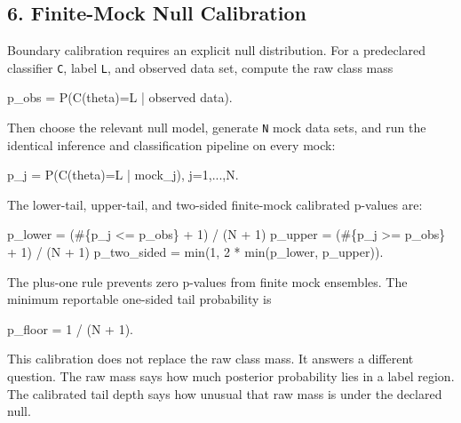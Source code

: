 \documentclass[
]{article}
\newenvironment{Shaded}{}{}
\newcommand{\NormalTok}[1]{#1}
\begin{document}
\subsection{6. Finite-Mock Null
Calibration}\label{finite-mock-null-calibration}

Boundary calibration requires an explicit null distribution. For a
predeclared classifier \texttt{C}, label \texttt{L}, and observed data
set, compute the raw class mass

\begin{Shaded}
\begin{Highlighting}[]
\NormalTok{p\_obs = P(C(theta)=L | observed data).}
\end{Highlighting}
\end{Shaded}

Then choose the relevant null model, generate \texttt{N} mock data sets,
and run the identical inference and classification pipeline on every
mock:

\begin{Shaded}
\begin{Highlighting}[]
\NormalTok{p\_j = P(C(theta)=L | mock\_j),  j=1,...,N.}
\end{Highlighting}
\end{Shaded}

The lower-tail, upper-tail, and two-sided finite-mock calibrated
p-values are:

\begin{Shaded}
\begin{Highlighting}[]
\NormalTok{p\_lower = (\#\{p\_j \textless{}= p\_obs\} + 1) / (N + 1)}
\NormalTok{p\_upper = (\#\{p\_j \textgreater{}= p\_obs\} + 1) / (N + 1)}
\NormalTok{p\_two\_sided = min(1, 2 * min(p\_lower, p\_upper)).}
\end{Highlighting}
\end{Shaded}

The plus-one rule prevents zero p-values from finite mock ensembles. The
minimum reportable one-sided tail probability is

\begin{Shaded}
\begin{Highlighting}[]
\NormalTok{p\_floor = 1 / (N + 1).}
\end{Highlighting}
\end{Shaded}

This calibration does not replace the raw class mass. It answers a
different question. The raw mass says how much posterior probability
lies in a label region. The calibrated tail depth says how unusual that
raw mass is under the declared null.
\end{document}
